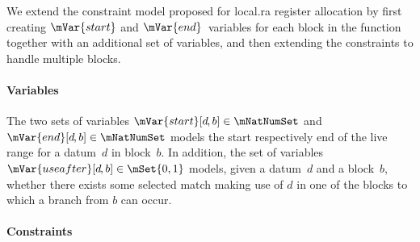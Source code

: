 We extend the \gls{constraint model} proposed for \gls{local.ra} \gls{register
  allocation} by first creating $\mVar{start}$ and $\mVar{end}$~\glspl{variable}
for each \gls{block} in the \gls{function} together with an additional set of
\glspl{variable}, and then extending the \glspl{constraint} to handle multiple
\glspl{block}.


\paragraph{Variables}

The two sets of \glspl{variable} \mbox{$\mVar{start}[d \hspace{-1pt}, b] \in
  \mNatNumSet$} and \mbox{$\mVar{end}[d \hspace{-1pt}, b] \in \mNatNumSet$}
models the start respectively end of the \gls{live range} for a \gls{datum}~$d$
in \gls{block}~$b$\hspace{-1pt}.
%
In addition, the set of \glspl{variable} \mbox{$\mVar{useafter}[d \hspace{-1pt},
    b] \in \mSet{0, 1}$} models, given a \gls{datum}~$d$ and a
\gls{block}~$b$\hspace{-1pt}, whether there exists some selected \gls{match}
making use of $d$ in one of the \glspl{block} to which a branch from $b$ can
occur.


\paragraph{Constraints}

